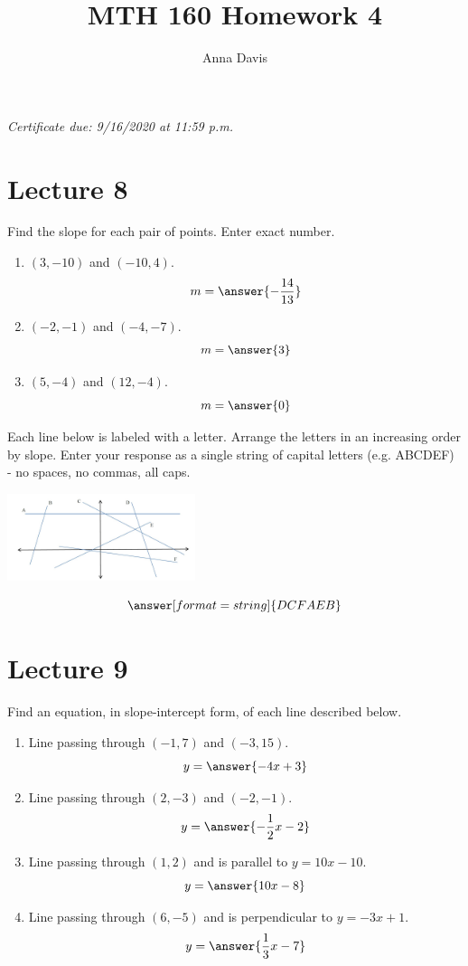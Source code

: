 \documentclass{ximera}
\author{Anna Davis} \title{MTH 160 Homework 4}
\begin{document}
\begin{abstract}

\end{abstract}
\maketitle
 \textit{Certificate due: 9/16/2020 at 11:59 p.m.}
 \section{Lecture 8}
\begin{problem}\label{prob:160hom4prob1} 
 Find the slope for each pair of points.  Enter exact number.
 \begin{enumerate}
     \item $(3, -10)$ and $(-10,4)$.
     $$m=\answer{-\frac{14}{13}}$$
     \item $(-2, -1)$ and $(-4,-7)$.
     $$m=\answer{3}$$
     \item $(5, -4)$ and $(12,-4)$.
     $$m=\answer{0}$$
 \end{enumerate}
 \end{problem}
 
 \begin{problem}\label{prob:160hom4prob2} 
 Each line below is labeled with a letter.  Arrange the letters in an increasing order by slope.  Enter your response as a single string of capital letters (e.g. ABCDEF) - no spaces, no commas, all caps.
 
 \begin{image}
   \includegraphics[height=1in]{160H4pic1.jpg}
 \end{image}
 $$\answer[format=string]{DCFAEB}$$
 \end{problem}
 \section{Lecture 9}
\begin{problem}\label{prob:160hom4prob3}
Find an equation, in slope-intercept form, of each line described below.
  \begin{enumerate}
      \item Line passing through $(-1, 7)$ and $(-3, 15)$.
      $$y=\answer{-4x+3}$$
      \item Line passing through $(2, -3)$ and $(-2, -1)$.
      $$y=\answer{-\frac{1}{2}x-2}$$
      \item Line passing through $(1,2)$ and is parallel to $y=10x-10$.
      $$y=\answer{10x-8}$$
      \item Line passing through $(6, -5)$ and is perpendicular to $y=-3x+1$.
      $$y=\answer{\frac{1}{3}x-7}$$
  \end{enumerate}
\end{problem}
\end{document}
